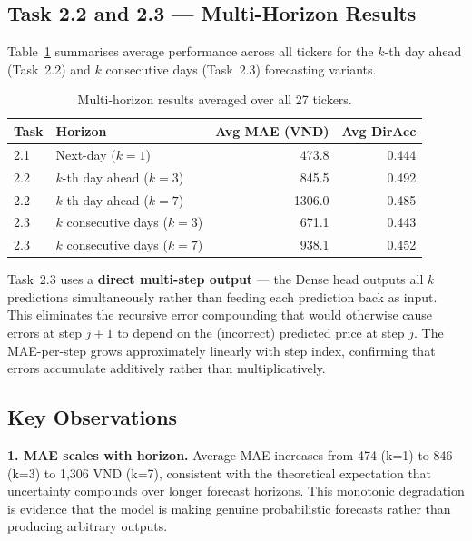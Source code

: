 \documentclass[12pt, a4paper]{article}
\begin{document}
\subsection{Task 2.2 and 2.3 --- Multi-Horizon Results}

Table~\ref{tab:task22_23} summarises average performance across all
tickers for the $k$-th day ahead (Task~2.2) and $k$ consecutive days
(Task~2.3) forecasting variants.

\begin{table}[h]
\centering
\caption{Multi-horizon results averaged over all 27 tickers.}
\label{tab:task22_23}
\renewcommand{\arraystretch}{1.3}
\begin{tabular}{llrr}
\hline
\textbf{Task} & \textbf{Horizon} & \textbf{Avg MAE (VND)} & \textbf{Avg DirAcc} \\
\hline
2.1 & Next-day ($k=1$)             &  473.8 & 0.444 \\
2.2 & $k$-th day ahead ($k=3$)     &  845.5 & 0.492 \\
2.2 & $k$-th day ahead ($k=7$)     & 1306.0 & 0.485 \\
\hline
2.3 & $k$ consecutive days ($k=3$) &  671.1 & 0.443 \\
2.3 & $k$ consecutive days ($k=7$) &  938.1 & 0.452 \\
\hline
\end{tabular}
\end{table}

Task~2.3 uses a \textbf{direct multi-step output} --- the Dense head
outputs all $k$ predictions simultaneously rather than feeding each
prediction back as input. This eliminates the recursive error compounding
that would otherwise cause errors at step $j+1$ to depend on the
(incorrect) predicted price at step $j$. The MAE-per-step grows
approximately linearly with step index, confirming that errors accumulate
additively rather than multiplicatively.

\subsection{Key Observations}
\label{sec:t2_observations}

\textbf{1. MAE scales with horizon.}
Average MAE increases from 474 (k=1) to 846 (k=3) to 1,306 VND (k=7),
consistent with the theoretical expectation that uncertainty compounds
over longer forecast horizons. This monotonic degradation is evidence
that the model is making genuine probabilistic forecasts rather than
producing arbitrary outputs.
\end{document}
